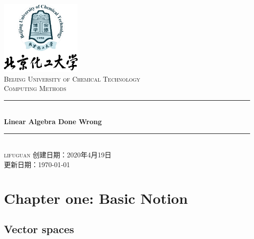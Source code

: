 \documentclass[cs4size,a4paper]{ctexart}
\numberwithin{equation}{section}
\numberwithin{table}{section}
\numberwithin{figure}{section}
\newcommand{\HRule}{\rule{\linewidth}{0.5mm}}
\begin{document}
\newtheorem{example}{例}              	%
\newtheorem{algorithem}{算法}	
\newtheorem{theorem}{定理}            	%
\newtheorem{definition}{定义}
\newtheorem{axiom}{公理}
\newtheorem{property}{性质}
\newtheorem{proposition}{命题}
\newtheorem{lemma}{引理}
\newtheorem{corollary}{推论}
\newtheorem{remark}{注解}
\newtheorem{condition}{条件}
\newtheorem{conclusion}{结论}
\newtheorem{assumption}{Assumption}
\renewcommand{\contentsname}{目录}     
\renewcommand{\abstractname}{摘要} 
\renewcommand{\refname}{参考文献}     
\renewcommand{\indexname}{索引}
\renewcommand{\figurename}{图}
\renewcommand{\tablename}{表}
\renewcommand{\appendixname}{附录}
\renewcommand{\proofname}{证明}
\renewcommand\emph[1]{\textcolor{black}{\textbf{#1}}}
\begin{titlepage}
\begin{center}
\includegraphics[width=0.30\textwidth]{logo}\\[1cm]    
\textsc{\Large Beijing University of Chemical Technology}\\[1.0cm]
\textsc{\Large Computing Methods}\\[0.5cm]
\HRule \\[0.8cm]
{\huge \bfseries Linear Algebra Done Wrong}\\[0.4cm]
\HRule \\[0.7cm]
\textsc{lifuguan}
\tableofcontents  
\vfill 
{创建日期：2020年4月19日}\\
{更新日期：\today}
\end{center}
\end{titlepage}
\pagestyle{plain}
\thispagestyle{empty}
\pagestyle{fancy}

\section{Chapter one: Basic Notion}
\subsection{Vector spaces}
\end{document}
